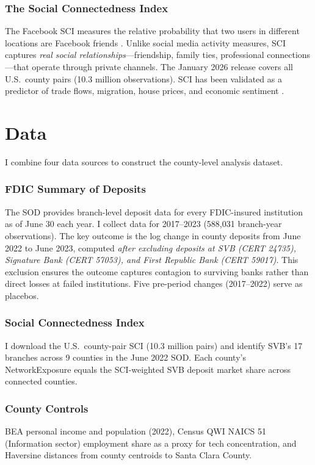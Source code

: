 \documentclass[12pt]{article}
\begin{document}
\subsubsection*{The Social Connectedness Index} The Facebook SCI measures the relative probability that two users in different locations are Facebook friends \citep{Baileyetal2018}. Unlike social media activity measures, SCI captures \textit{real social relationships}---friendship, family ties, professional connections---that operate through private channels. The January 2026 release covers all U.S.\ county pairs (10.3 million observations). SCI has been validated as a predictor of trade flows, migration, house prices, and economic sentiment \citep{Baileyetal2020, Kuchleretal2022}.

\section{Data}

I combine four data sources to construct the county-level analysis dataset.

\subsubsection*{FDIC Summary of Deposits} The SOD provides branch-level deposit data for every FDIC-insured institution as of June 30 each year. I collect data for 2017--2023 (588,031 branch-year observations). The key outcome is the log change in county deposits from June 2022 to June 2023, computed \textit{after excluding deposits at SVB (CERT 24735), Signature Bank (CERT 57053), and First Republic Bank (CERT 59017)}. This exclusion ensures the outcome captures contagion to surviving banks rather than direct losses at failed institutions. Five pre-period changes (2017--2022) serve as placebos.

\subsubsection*{Social Connectedness Index} I download the U.S.\ county-pair SCI (10.3 million pairs) and identify SVB's 17 branches across 9 counties in the June 2022 SOD. Each county's NetworkExposure equals the SCI-weighted SVB deposit market share across connected counties.

\subsubsection*{County Controls} BEA personal income and population (2022), Census QWI NAICS 51 (Information sector) employment share as a proxy for tech concentration, and Haversine distances from county centroids to Santa Clara County.
\end{document}
